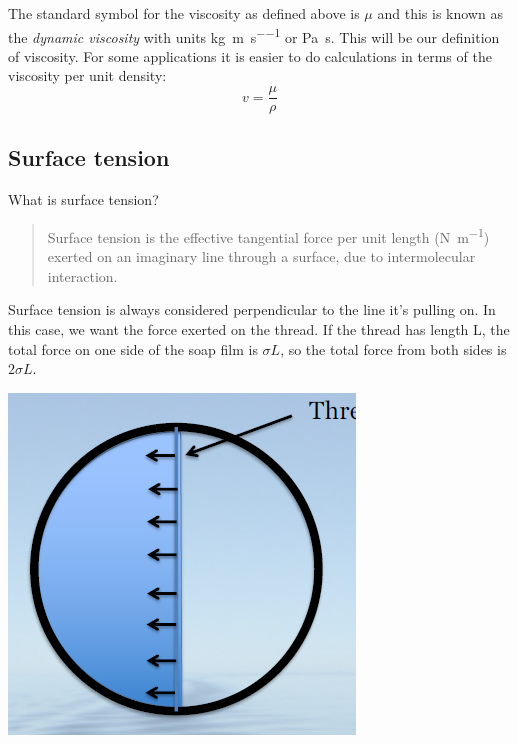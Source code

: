 \documentclass[class=report, crop=false, 12pt,a4paper]{standalone}
\begin{document}
The standard symbol for the viscosity as defined above is \( \mu \) and this is known as the \emph{dynamic viscosity} with units \si{\kg\per\meter\per\second} or \si{\pascal \second}. This will be our definition of viscosity. For some applications it is easier to do calculations in terms of the viscosity per unit density:
\begin{equation}
  v = \frac{\mu}{\rho}
\end{equation}

\subsection{Surface tension}
What is surface tension?
\begin{quote}
  \begin{center}
    Surface tension is the effective tangential force per unit length (\si{\newton\per\meter}) exerted on an imaginary line through a surface, due to intermolecular interaction.
  \end{center}
\end{quote}

Surface tension is always considered perpendicular to the line it's pulling on. In this case, we want the force exerted on the thread. If the thread has length L, the total force on one side of the soap film is \(\sigma L\), so the total force from both sides is \(2\sigma L\).
\begin{center}
  \includegraphics[width = 0.4 \textwidth]{../img/SoapFilm}
\end{center}
\end{document}
